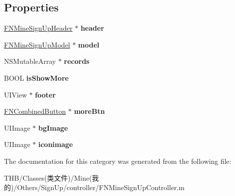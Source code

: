 \subsection*{Properties}
\begin{DoxyCompactItemize}
\item 
\mbox{\label{category_f_n_mine_sign_up_controller_07_08_a6bb342f4140e51ccb090355bbdd7062a}} 
\mbox{\hyperlink{interface_f_n_mine_sign_up_header}{F\+N\+Mine\+Sign\+Up\+Header}} $\ast$ {\bfseries header}
\item 
\mbox{\label{category_f_n_mine_sign_up_controller_07_08_ababf477d8a451d09ce125397572612f5}} 
\mbox{\hyperlink{interface_f_n_mine_sign_up_model}{F\+N\+Mine\+Sign\+Up\+Model}} $\ast$ {\bfseries model}
\item 
\mbox{\label{category_f_n_mine_sign_up_controller_07_08_a7914e22df4e13e539ab9fc49e3852a42}} 
N\+S\+Mutable\+Array $\ast$ {\bfseries records}
\item 
\mbox{\label{category_f_n_mine_sign_up_controller_07_08_a70f6559838562f4eca9b965fd361a6c6}} 
B\+O\+OL {\bfseries is\+Show\+More}
\item 
\mbox{\label{category_f_n_mine_sign_up_controller_07_08_a76ff008ac2f22bf5f97da8c28b37ff20}} 
U\+I\+View $\ast$ {\bfseries footer}
\item 
\mbox{\label{category_f_n_mine_sign_up_controller_07_08_ad669c26f1b7f80ac710456a3191688c7}} 
\mbox{\hyperlink{interface_f_n_combined_button}{F\+N\+Combined\+Button}} $\ast$ {\bfseries more\+Btn}
\item 
\mbox{\label{category_f_n_mine_sign_up_controller_07_08_a879639f7b308607bf796072348a0badb}} 
U\+I\+Image $\ast$ {\bfseries bg\+Image}
\item 
\mbox{\label{category_f_n_mine_sign_up_controller_07_08_a11677db259e703e62dcd033fd843a835}} 
U\+I\+Image $\ast$ {\bfseries iconimage}
\end{DoxyCompactItemize}


The documentation for this category was generated from the following file\+:\begin{DoxyCompactItemize}
\item 
T\+H\+B/\+Classes(类文件)/\+Mine(我的)/\+Others/\+Sign\+Up/controller/F\+N\+Mine\+Sign\+Up\+Controller.\+m\end{DoxyCompactItemize}
